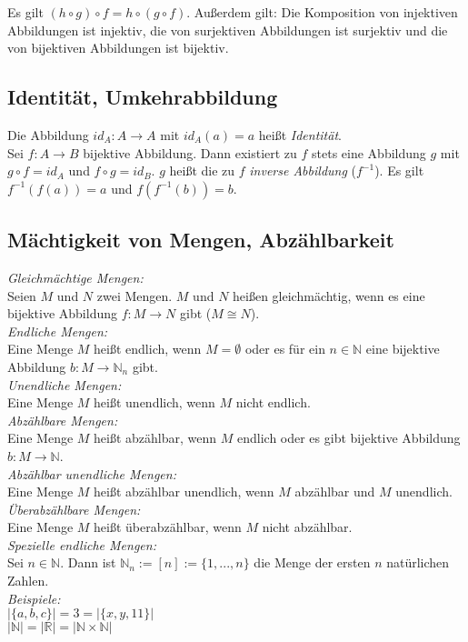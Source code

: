 
Es gilt $(h\circ g)\circ f=h\circ (g\circ f)$. Außerdem gilt:
Die Komposition von injektiven Abbildungen ist injektiv, die von surjektiven Abbildungen ist surjektiv und die von bijektiven Abbildungen ist bijektiv.
\subsection*{Identität, Umkehrabbildung}
Die Abbildung $id_A:A\to A$ mit $id_A(a)=a$ heißt \emph{Identität}.\\
Sei $f:A\to B$ bijektive Abbildung. Dann existiert zu $f$ stets eine Abbildung $g$ mit 
$g\circ f=id_A$ und $f\circ g=id_B$. $g$ heißt die zu $f$ \emph{inverse Abbildung} ($f^{-1}$).
Es gilt $f^{-1}(f(a))=a$ und $f(f^{-1}(b))=b$.
\subsection*{Mächtigkeit von Mengen, Abzählbarkeit}
\emph{Gleichmächtige Mengen:}\\
Seien $M$ und $N$ zwei Mengen. $M$ und $N$ heißen gleichmächtig, wenn es eine bijektive
Abbildung $f:M\to N$ gibt ($M\cong N$).\\
\emph{Endliche Mengen:}\\
Eine Menge $M$ heißt endlich, wenn $M=\emptyset$ oder es für ein $n\in\mathbb{N}$ eine
bijektive Abbildung $b:M\to\mathbb{N}_n$ gibt.\\
\emph{Unendliche Mengen:}\\
Eine Menge $M$ heißt unendlich, wenn $M$ nicht endlich.\\
\emph{Abzählbare Mengen:}\\
Eine Menge $M$ heißt abzählbar, wenn $M$ endlich oder es gibt bijektive
Abbildung $b:M\to\mathbb{N}$.\\
\emph{Abzählbar unendliche Mengen:}\\
Eine Menge $M$ heißt abzählbar unendlich, wenn $M$ abzählbar und $M$ unendlich.\\
\emph{Überabzählbare Mengen:}\\
Eine Menge $M$ heißt überabzählbar, wenn $M$ nicht abzählbar.\\
\emph{Spezielle endliche Mengen:}\\
Sei $n\in\mathbb{N}$. Dann ist $\mathbb{N}_n:=[n]:=\{1,...,n\}$ die Menge der ersten
$n$ natürlichen Zahlen.\\
\emph{Beispiele:}\\
$|\{a,b,c\}|=3=|\{x,y,11\}|$\\
$|\mathbb{N}|=|\mathbb{R}|=|\mathbb{N}\times\mathbb{N}|$
